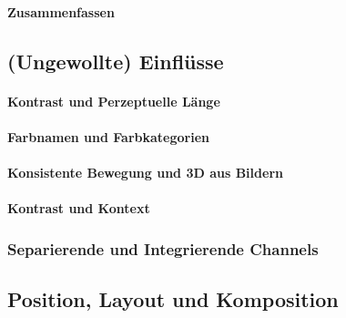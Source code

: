                 \paragraph{Zusammenfassen} %

        \subsection{(Ungewollte) Einflüsse} %

                \paragraph{Kontrast und Perzeptuelle Länge} %

                \paragraph{Farbnamen und Farbkategorien} %

                \paragraph{Konsistente Bewegung und 3D aus Bildern} %

                \paragraph{Kontrast und Kontext} %

            \subsubsection{Separierende und Integrierende Channels} %

        \subsection{Position, Layout und Komposition} %

